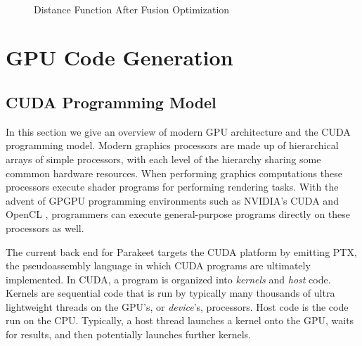 \documentclass[preprint]{sigplanconf}
\begin{document}
\\[5pt]
\begin{figure}[h!]

\caption{Distance Function After Fusion Optimization}
\end{figure}



\section{GPU Code Generation}
\subsection{CUDA Programming Model}

In this section we give an overview of modern GPU architecture and the CUDA
programming model.  Modern graphics processors are made up of hierarchical
arrays of simple processors, with each level of the hierarchy sharing some
commmon hardware resources.  When performing graphics computations these
processors execute shader programs for performing rendering tasks.  With the
advent of GPGPU programming environments such as NVIDIA's CUDA \cite{NvidCU} and
OpenCL \cite{Muns10}, programmers can execute general-purpose programs directly
on these processors as well.

The current back end for Parakeet targets the CUDA platform by emitting PTX, the
pseudoassembly language in which CUDA programs are ultimately implemented.
In CUDA, a program is organized into {\it kernels} and {\it host} code.
Kernels are sequential code that is run by typically many thousands of ultra
lightweight threads on the GPU's, or {\it device}'s, processors.  Host code is
the code run on the CPU. Typically, a host thread launches a kernel onto the
GPU, waits for results, and then potentially launches further kernels.
\end{document}
